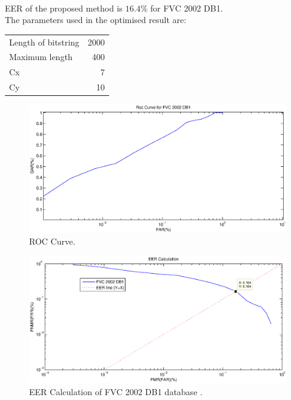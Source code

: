 \documentclass[14pt, oneside]{article}   	%
\begin{document}
\paragraph{}
EER of the proposed method is $16.4\%$ for FVC 2002 DB1.   \\
The parameters used in the optimised result are:\\

\begin{tabular}{ l || r }

  \hline                       
  Length of bitstring& 2000 \\
  Maximum length & 400 \\
  Cx& 7 \\
  Cy & 10\\
  \hline  
\end{tabular}

\begin{figure}[htbp]
\begin{center}
\includegraphics[width=180mm,scale=0.5]{FVC2002_DB1_ROC.eps}
\caption{ROC Curve.}
\end{center}
\end{figure} 

\begin{figure}[htbp]
\begin{center}
\includegraphics[width=180mm,scale=0.5]{EERf.eps}
\caption{EER Calculation of FVC 2002 DB1 database .}
\end{center}
\end{figure} 
\end{document}
